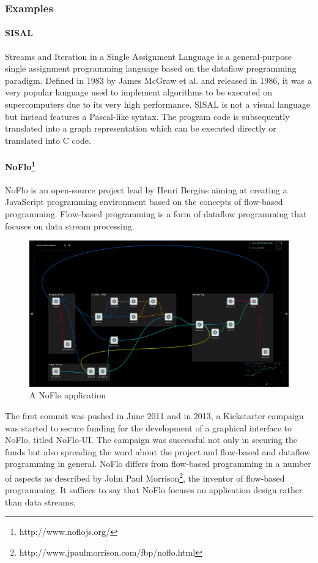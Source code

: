 \documentclass[11pt,a4paper]{globis-book}
\begin{document}
\subsubsection*{Examples}
\paragraph*{SISAL}
Streams and Iteration in a Single Assignment Language\cite{mcgraw1983sisal} is a general-purpose single assignment programming language based on the dataflow programming paradigm. Defined in 1983 by James McGraw et al. and released in 1986, it was a very popular language used to implement algorithms to be executed on supercomputers due to its very high performance. SISAL is not a visual language but instead features a Pascal-like syntax. The program code is subsequently translated into a graph representation which can be executed directly or translated into C code.

\paragraph*{NoFlo\footnote{http://www.noflojs.org/}}
NoFlo is an open-source project lead by Henri Bergius aiming at creating a JavaScript programming environment based on the concepts of flow-based programming. Flow-based programming is a form of dataflow programming that focuses on data stream processing.

\begin{figure}[h]
  \centering
  \includegraphics[width=\textwidth]{resources/NoFlo.png}
  \caption{A NoFlo application}
  \label{fig:noflo}
\end{figure}

The first commit was pushed in June 2011 and in 2013, a Kickstarter campaign was started to secure funding for the development of a graphical interface to NoFlo, titled NoFlo-UI. The campaign was successful not only in securing the funds but also spreading the word about the project and flow-based and dataflow programming in general. NoFlo differs from flow-based programming in a number of aspects as described by John Paul Morrison\footnote{http://www.jpaulmorrison.com/fbp/noflo.html}, the inventor of flow-based programming. It suffices to say that NoFlo focuses on application design rather than data streams.
\end{document}
